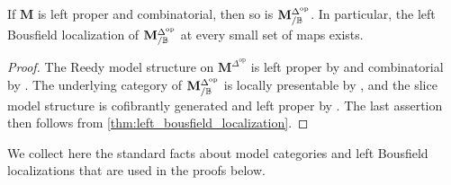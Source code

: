 \documentclass[10pt,reqno]{amsart}
\begin{document}
\begin{proposition}
\label{prop:reedy_localization_existence}
If $\mathbf M$ is left proper and combinatorial, then so is
$\mathbf M^{\Delta^{\mathrm{op}}}_{/\mathbb B}$. In particular, the left Bousfield localization of
$\mathbf M^{\Delta^{\mathrm{op}}}_{/\mathbb B}$ at every small set of maps exists.
\end{proposition}
\begin{proof}
The Reedy model structure on $\mathbf M^{\Delta^{\mathrm{op}}}$ is
left proper by \cite[Theorem~15.3.4\textup{(2)}]{hirschhorn2003model}
and combinatorial by \cite[Lemma~3.33]{barwick2010bousfield}. The
underlying category of $\mathbf M^{\Delta^{\mathrm{op}}}_{/\mathbb B}$ is locally presentable by
\cite[Proposition~1.57]{adamek_rosicky1994}, and the slice model
structure is cofibrantly generated and left proper by
\cite[Theorem~1.7\textup{(1), (3)}]{Hirschhorn2015Overcategories}.
The last assertion then follows from
\cref{thm:left_bousfield_localization}.
\end{proof}

We collect here the standard facts about model categories and left
Bousfield localizations that are used in the proofs below.
\end{document}

